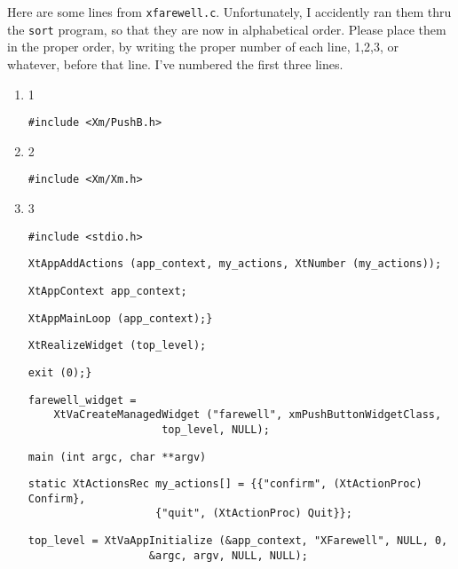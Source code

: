 \documentclass[twoside]{article}
\begin{document}
\begin{enumerate}
 Here are some lines from \texttt{xfarewell.c}.
Unfortunately, I accidently ran them thru the \texttt{sort}
program, so that they are now in alphabetical order.  Please
place them in the proper order, by writing the proper number of
each line, 1,2,3, or whatever, before that line.   I've numbered
the first three lines.
\begin{enumerate}

\item 1
\begin{verbatim}
#include <Xm/PushB.h>		
\end{verbatim}
\item 2
\begin{verbatim}
#include <Xm/Xm.h>		
\end{verbatim}
\item 3
\begin{verbatim}
#include <stdio.h>		
\end{verbatim}
\itemsp
\begin{verbatim}
XtAppAddActions (app_context, my_actions, XtNumber (my_actions));
\end{verbatim}
\itemsp
\begin{verbatim}
XtAppContext app_context;
\end{verbatim}
\itemsp
\begin{verbatim}
XtAppMainLoop (app_context);}
\end{verbatim}
\itemsp
\begin{verbatim}
XtRealizeWidget (top_level);	
\end{verbatim}
\itemsp
\begin{verbatim}
exit (0);}
\end{verbatim}
\itemsp
\begin{verbatim}
farewell_widget = 
	XtVaCreateManagedWidget ("farewell", xmPushButtonWidgetClass,
	   		         top_level, NULL);
\end{verbatim}
\itemsp
\begin{verbatim}
main (int argc, char **argv)
\end{verbatim}
\itemsp
\begin{verbatim}
static XtActionsRec my_actions[] = {{"confirm", (XtActionProc) Confirm}, 
				    {"quit", (XtActionProc) Quit}};
\end{verbatim}
\itemsp
\begin{verbatim}
top_level = XtVaAppInitialize (&app_context, "XFarewell", NULL, 0,
			       &argc, argv, NULL, NULL);
\end{verbatim}
\itemsp
\begin{verbatim}

\end{verbatim}
\end{enumerate}
\end{enumerate}
\end{document}
